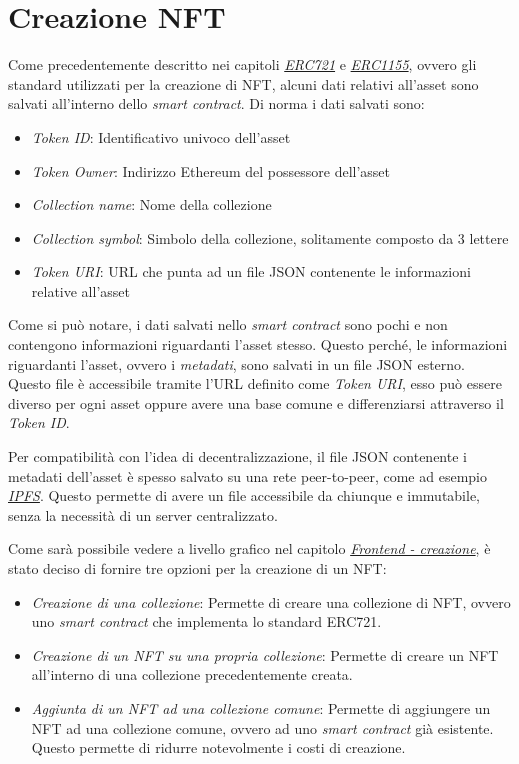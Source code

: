 \section{Creazione NFT}
\label{sec:creazioneNFT}
Come precedentemente descritto nei capitoli \hyperref[sec:erc721]{\textit{ERC721}} e \hyperref[sec:erc1155]{\textit{ERC1155}}, ovvero gli standard utilizzati per la creazione di NFT, alcuni dati relativi all'asset sono salvati all'interno dello \textit{smart contract}. Di norma i dati salvati sono:
\begin{itemize}
    \item \textit{Token ID}: Identificativo univoco dell'asset
    \item \textit{Token Owner}: Indirizzo Ethereum del possessore dell'asset
    \item \textit{Collection name}: Nome della collezione
    \item \textit{Collection symbol}: Simbolo della collezione, solitamente composto da 3 lettere
    \item \textit{Token URI}: URL che punta ad un file JSON contenente le informazioni relative all'asset
\end{itemize}

Come si può notare, i dati salvati nello \textit{smart contract} sono pochi e non contengono informazioni riguardanti l'asset stesso. Questo perché, le informazioni riguardanti l'asset, ovvero i \textit{metadati}, sono salvati in un file JSON esterno. Questo file è accessibile tramite l'URL definito come \textit{Token URI}, esso può essere diverso per ogni asset oppure avere una base comune e differenziarsi attraverso il \textit{Token ID}.

Per compatibilità con l'idea di decentralizzazione, il file JSON contenente i metadati dell'asset è spesso salvato su una rete peer-to-peer, come ad esempio \hyperref[sec:ipfs]{\textit{IPFS}}. Questo permette di avere un file accessibile da chiunque e immutabile, senza la necessità di un server centralizzato.



Come sarà possibile vedere a livello grafico nel capitolo \hyperref[sec:creazione]{\textit{Frontend - creazione}}, è stato deciso di fornire tre opzioni per la creazione di un NFT:

\begin{itemize}
    \item \textit{Creazione di una collezione}: Permette di creare una collezione di NFT, ovvero uno \textit{smart contract} che implementa lo standard ERC721.
    \item \textit{Creazione di un NFT su una propria collezione}: Permette di creare un NFT all'interno di una collezione precedentemente creata. 
    \item \textit{Aggiunta di un NFT ad una collezione comune}: Permette di aggiungere un NFT ad una collezione comune, ovvero ad uno \textit{smart contract} già esistente. Questo permette di ridurre notevolmente i costi di creazione.
\end{itemize}

